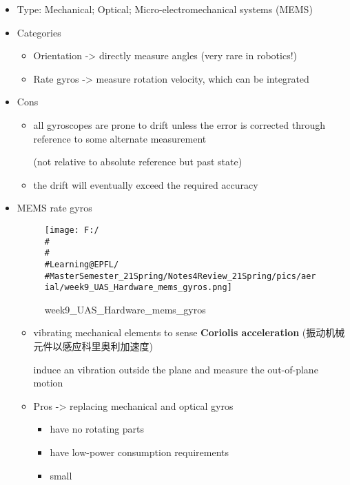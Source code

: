 \documentclass[]{article}
\begin{document}
\begin{itemize}
\item
  Type: Mechanical; Optical; Micro-electromechanical systems (MEMS)
\item
  Categories

  \begin{itemize}
  \item
    Orientation -\textgreater{} directly measure angles (very rare in
    robotics!)
  \item
    Rate gyros -\textgreater{} measure rotation velocity, which can be
    integrated
  \end{itemize}
\item
  Cons

  \begin{itemize}
  \item
    all gyroscopes are prone to drift unless the error is corrected
    through reference to some alternate measurement

    (not relative to absolute reference but past state)
  \item
    the drift will eventually exceed the required accuracy
  \end{itemize}
\item
  MEMS rate gyros

  \begin{figure}
  \centering
  \texttt{[image: F:/\\\#\\\#\\\#Learning@EPFL/\\\#MasterSemester\_21Spring/Notes4Review\_21Spring/pics/aerial/week9\_UAS\_Hardware\_mems\_gyros.png]}
  \caption{week9\_UAS\_Hardware\_mems\_gyros}
  \end{figure}

  \begin{itemize}
  \item
    vibrating mechanical elements to sense \textbf{Coriolis
    acceleration} (振动机械元件以感应科里奥利加速度)

    induce an vibration outside the plane and measure the out-of-plane
    motion
  \item
    Pros -\textgreater{} replacing mechanical and optical gyros

    \begin{itemize}
    \item
      have no rotating parts
    \item
      have low-power consumption requirements
    \item
      small
    \end{itemize}
  \end{itemize}
\end{itemize}
\end{document}
